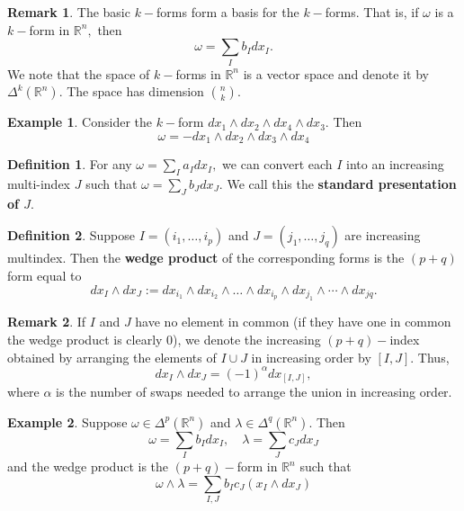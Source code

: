 \documentclass[10pt, oneside]{article}
\newcommand{\bbR}{\mathbb{R}}
\theoremstyle{definition}
\newtheorem{exmp}{Example}[section]
\newtheorem{defn}{Definition}
\newtheorem{rem}{Remark}
\begin{document}
\begin{rem}
    The basic $k-$forms form a basis for the $k-$forms. That is, if $\omega$ is a $k-$form in $\bbR^n,$ then 
    \[\omega = \sum_I b_I dx_I.\] We note that the space of $k-$forms in $\bbR^n$ is a vector space and denote it by $\Delta^k(\bbR^n).$ The space has dimension $\binom{n}{k}.$ 
\end{rem}
\begin{exmp}
    Consider the $k-$form $dx_1 \wedge dx_2 \wedge dx_4 \wedge dx_3.$ Then 
    \[\omega = -dx_1 \wedge dx_2 \wedge dx_3 \wedge dx_4\]
\end{exmp}
\begin{defn}
    For any $\omega = \sum_I a_I dx_I,$ we can convert each $I$ into an increasing multi-index $J$ such that $\omega = \sum_J b_J dx_J.$ We call this the \textbf{standard presentation of $J$}.
\end{defn}
\begin{defn}
    Suppose $I = (i_1, \dots, i_p)$ and $J = (j_1, \dots, j_q)$ are increasing multindex. Then the \textbf{wedge product} of the corresponding forms is the $(p + q)$ form equal to 
    \[dx_I \wedge dx_J := dx_{i_1} \wedge dx_{i_2} \wedge \dots \wedge dx_{i_p} \wedge dx_{j_1} \wedge \cdots \wedge dx_{jq}.\] 
\end{defn}
\begin{rem}
    If $I$ and $J$ have no element in common (if they have one in common the wedge product is clearly $0$), we denote the increasing $(p+q)-$index obtained by arranging the elements of $I \cup J$ in increasing order by $[I,J].$ Thus, 
    \[dx_I \wedge dx_J = (-1)^\alpha dx_{[I,J]},\] where $\alpha$ is the number of swaps needed to arrange the union in increasing order.
\end{rem}

\begin{exmp}
    Suppose $\omega \in \Delta^p(\bbR^n)$ and $\lambda \in \Delta^q(\bbR^n).$ Then 
    \[\omega = \sum_I b_I dx_I, \quad \lambda = \sum_J c_J dx_J\]  and the wedge product is the $(p+q)-$form in $\bbR^n$ such that 
    \[\omega \wedge \lambda = \sum_{I,J}b_I c_J(x_I \wedge dx_J)\]
\end{exmp}
\end{document}
